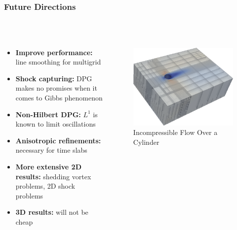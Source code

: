 \documentclass[18pt,xcolor=table]{beamer}
\begin{document}
\begin{frame}
\frametitle{Future Directions}
\framesubtitle{~}
\begin{columns}
\begin{column}{0.5\textwidth}
\begin{itemize}
\item \textbf{Improve performance:} line smoothing for multigrid
\item \textbf{Shock capturing:} DPG makes no promises when it comes to Gibbs phenomenon
\item \textbf{Non-Hilbert DPG:} $L^1$ is known to limit oscillations
\item \textbf{Anisotropic refinements:} necessary for time slabs
\item \textbf{More extensive 2D results:} shedding vortex problems, 2D shock problems
\item \textbf{3D results:} will not be cheap
\end{itemize}
\end{column}
\begin{column}{0.5\textwidth}
\begin{figure}
\centering
\includegraphics[width=\textwidth]{Dissertation/Cylinder/Mesh_uMag4.png}
\\Incompressible Flow Over a Cylinder
\end{figure}
\end{column}
\end{columns}
\end{frame}
\end{document}
